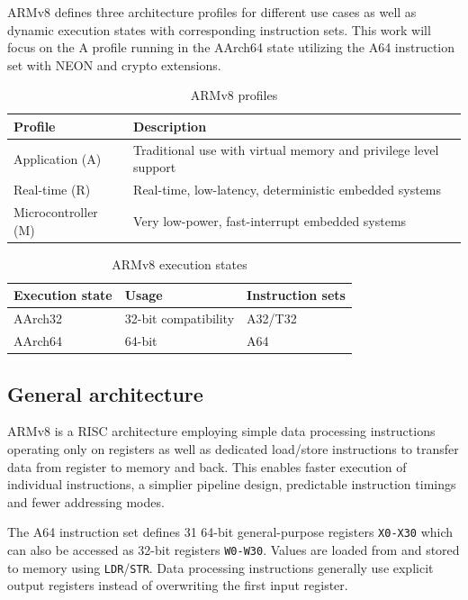 ARMv8 defines three architecture profiles for different use cases as well as
dynamic execution states with corresponding instruction sets. This work will
focus on the A profile running in the AArch64 state utilizing the A64
instruction set with NEON and crypto extensions.

\begin{table}[h!]
    \centering
    \caption{ARMv8 profiles}
    \begin{tabularx}{\textwidth}{lX}
        \toprule
        Profile & Description \\
        \midrule
        Application (A) & Traditional use with virtual memory and privilege level support \\
        Real-time (R) & Real-time, low-latency, deterministic embedded systems \\
        Microcontroller (M) & Very low-power, fast-interrupt embedded systems \\
        \bottomrule
    \end{tabularx}
\end{table}

\begin{table}[h!]
    \centering
    \caption{ARMv8 execution states}
    \begin{tabularx}{\textwidth}{llX}
        \toprule
        Execution state & Usage & Instruction sets \\
        \midrule
        AArch32 & 32-bit compatibility & A32/T32 \\
        AArch64 & 64-bit & A64 \\
        \bottomrule
    \end{tabularx}
\end{table}

\subsection{General architecture}

ARMv8 is a RISC architecture employing simple data processing instructions
operating only on registers as well as dedicated load/store instructions to
transfer data from register to memory and back. This enables faster execution
of individual instructions, a simplier pipeline design, predictable instruction
timings and fewer addressing modes.

The A64 instruction set defines 31 64-bit general-purpose registers
\texttt{X0-X30} which can also be accessed as 32-bit registers \texttt{W0-W30}.
Values are loaded from and stored to memory using \texttt{LDR}/\texttt{STR}.
Data processing instructions generally use explicit output registers instead of
overwriting the first input register.

